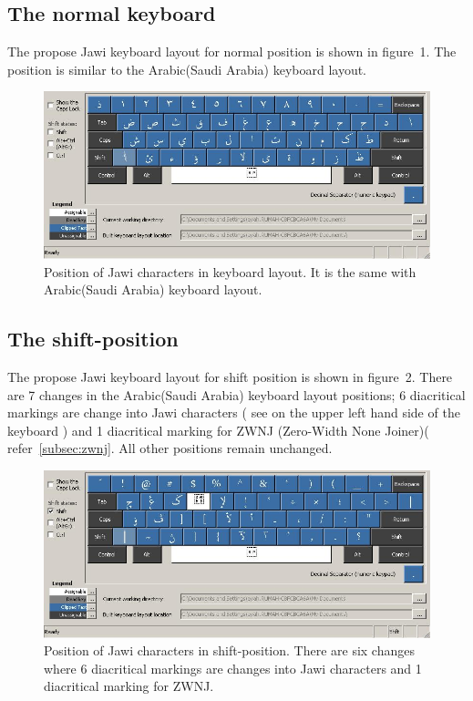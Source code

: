\documentclass[12pt,a4paper]{IEEEconf}
\begin{document}
\subsection{The normal keyboard}

The propose Jawi keyboard layout for normal position is shown in figure~1. The position is similar to the Arabic(Saudi Arabia) keyboard layout.

\begin{center}
\begin{figure}[th] \label{fig:jawi1}
\caption{Position of Jawi characters in keyboard layout. It is the same with Arabic(Saudi Arabia) keyboard layout.}
\includegraphics[width=\columnwidth]{Jawi.jpg}
\end{figure}
\end{center}

\subsection{The shift-position}

The propose Jawi keyboard layout for shift position is shown in figure~2. There are 7 changes in the Arabic(Saudi Arabia) keyboard layout positions; 6 diacritical markings are change into Jawi characters ( see on the upper left hand side of the keyboard ) and 1 diacritical marking for ZWNJ (Zero-Width None Joiner)( refer~\ref{subsec:zwnj}. All other positions remain unchanged. 

\begin{figure}[th] \label{fig:jawi2}
\caption{Position of Jawi characters in shift-position. There are six changes where 6 diacritical markings are changes into Jawi characters  and 1 diacritical marking for ZWNJ.}
\includegraphics[width=\columnwidth]{JawiShft.jpg}
\end{figure}
\end{document}
